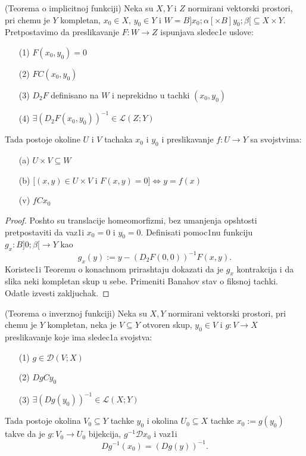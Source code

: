 \documentclass[a4paper,12pt]{article}
\begin{document}
\begin{tma}
(Teorema o implicitnoj funkciji) Neka su $X, Y$ i $Z$ normirani vektorski prostori, pri chemu je $Y$ kompletan, $x_0 \in X$, $y_0 \in Y$ i $W = B]x_0; \alpha[ \times B]y_0; \beta[ \subseteq X \times Y$. Pretpostavimo da preslikavanje $F:W \to Z$ ispunjava sledec1e uslove:
\begin{enumerate}
\item[(1)] $F(x_0, y_0) = 0$
\item[(2)] $FC(x_0, y_0)$
\item[(3)] $D_2F$ definisano na $W$ i neprekidno u tachki $(x_0, y_0)$
\item[(4)] $\exists {(D_2F(x_0, y_0))}^{-1} \in \mathcal{L} (Z; Y)$
\end{enumerate}
Tada postoje okoline $U$ i $ V$ tachaka $x_0$ i $y_0$ i preslikavanje $f: U \to Y$ sa svojstvima:
\begin{enumerate}
\item[(a)] $U \times V \subseteq W$
\item[(b)] $[(x,y)\in U \times V$ i $F(x,y) = 0] \iff y = f(x)$
\item[(v)] $fCx_0$

\end{enumerate}
\end{tma}
\begin{proof}
Poshto su translacije homeomorfizmi, bez umanjenja opshtosti pretpostaviti da vaz1i $x_0 = 0 $ i $y_0 = 0$. Definisati pomoc1nu funkciju $g_x: B]0; \beta[ \to Y$ kao \[g_x(y) := y - {(D_2F(0, 0))}^{-1} F(x,y).\] Koristec1i Teoremu o konachnom prirashtaju dokazati da je $g_x$ kontrakcija i da slika neki kompletan skup u sebe. Primeniti Banahov stav o fiksnoj tachki. Odatle izvesti zakljuchak. 
\end{proof}
\begin{tma}
(Teorema o inverznoj funkciji) Neka su $X, Y$ normirani vektorski prostori, pri chemu je $Y$ kompletan, neka je $V \subseteq Y$ otvoren skup, $y_0 \in V$ i $g: V \to X$ preslikavanje koje ima sledec1a svojstva:
\begin{enumerate}
\item[(1)] $g \in \mathcal{D}(V;X)$
\item[(2)] $DgCy_0$
\item[(3)] $\exists {(Dg(y_0))}^{-1} \in \mathcal{L} (X; Y)$
\end{enumerate}
Tada postoje okolina $V_0 \subseteq Y$ tachke $y_0$ i okolina $U_0 \subseteq X$ tachke $x_0 := g(y_0)$ takve da je $g: V_0 \to U_0$ bijekcija, $g^{-1} \mathcal{D} x_0$ i vaz1i \[ Dg^{-1}(x_0) = {(Dg(y))}^{-1}.\]
\end{tma}
\end{document}
